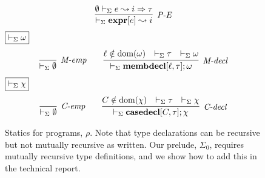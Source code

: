 \begin{figure}[t]
\[\begin{array}{c}
\infer[\textit{P-E}]
	{\vdash_\Sigma  \keyw{expr}[e] \leadsto i} 
	{\emptyset \vdash_\Sigma e \leadsto i \Rightarrow \tau}
\end{array}
\vspace{-15px}
\]
$\fbox{$\vdash_\Sigma \omega$}$
\[
\begin{array}{c}
\infer[\textit{M-emp}]
	{\vdash_\Sigma \emptyset}
	{ }~~~~~~
\infer[\textit{M-decl}]
	{\vdash_\Sigma \keyw{membdecl}[\ell, \tau]; \omega}
	{ \ell \notin \text{dom}(\omega) & \vdash_\Sigma \tau & \vdash_\Sigma \omega}
\end{array}
\]
$\fbox{$\vdash_\Sigma \chi$}$
\vspace{-15pt}\[
\begin{array}{c}
\infer[\textit{C-emp}]{\vdash_\Sigma \emptyset}{ }
~~~~~~
\infer[\textit{C-decl}]
	{\vdash_\Sigma \keyw{casedecl}[C, \tau]; \chi} 
	{C \notin \text{dom}(\chi) & \vdash_\Sigma \tau & \vdash_\Sigma \chi}
\end{array}
\]
\caption{Statics for programs, $\rho$. Note that type declarations can be recursive but not mutually recursive as written. Our prelude, $\Sigma_0$, requires mutually recursive type definitions, and we show how to add this in the technical report.}
\end{figure}
